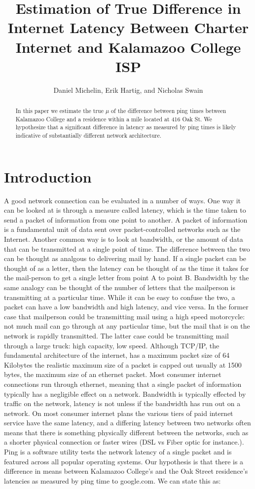 \documentclass{article}
\begin{document}

\title{Estimation of True Difference in Internet Latency Between Charter Internet and Kalamazoo College ISP}
\author{Daniel Michelin, Erik Hartig, and Nicholas Swain}
\maketitle
\begin{abstract}
In this paper we estimate the true $\mu$ of the difference between ping times between Kalamazoo College and a residence within a mile located at 416 Oak St. We hypothesize that a significant difference in latency as measured by ping times is likely indicative of substantially different network architecture. 
\end{abstract}
\section{Introduction}
A good network connection can be evaluated in a number of ways. One way it can be looked at is through a measure called latency, which is the time taken to send a packet of information from one point to another. A packet of information is a fundamental unit of data sent over packet-controlled networks such as the Internet. Another common way is to look at bandwidth, or the amount of data that can be transmitted at a single point of time. The difference between the two can be thought as analgous to delivering mail by hand. If a single packet can be thought of as a letter, then the latency can be thought of as the time it takes for the mail-person to get a single letter from point A to point B. Bandwidth by the same analogy can be thought of the number of letters that the mailperson is transmitting at a particular time. While it can be easy to confuse the two, a packet can have a low bandwidth and high latency, and vice versa. In the former case that mailperson could be transmitting mail using a high speed motorcycle: not much mail can go through at any particular time, but the mail that is on the network is rapidly transmitted. The latter case could be transmitting mail through a large truck: high capacity, low speed. Although TCP/IP, the fundamental architecture of the internet, has a maximum packet size of 64 Kilobytes the realistic maximum size of a packet is capped out usually at 1500 bytes, the maximum size of an ethernet packet. Most consumer internet connections run through ethernet, meaning that a single packet of information typically has a negligible effect on a network. Bandwidth is typically effected by traffic on the network, latency is not unless if the bandwidth has run out on a network. On most consumer internet plans the various tiers of paid internet service have the same latency, and a differing latency between two networks often means that there is something physically different between the networks, such as a shorter physical connection or faster wires (DSL vs Fiber optic for instance.). Ping is a software utility tests the network latency of a single packet and is featured across all popular operating systems. Our hypothesis is that there is a difference in means between Kalamazoo College's and the Oak Street residence's latencies as measured by ping time to google.com. We can state this as:
\end{document}
